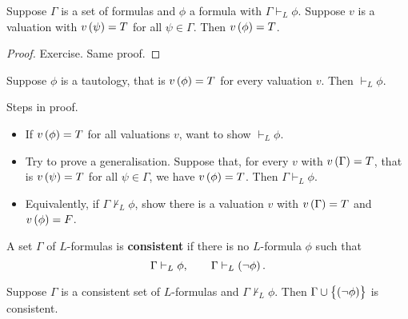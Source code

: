 \begin{theorem}
Suppose $ \Gamma $ is a set of formulas and $ \phi $ a formula with $ \Gamma \vdash_L \phi $. Suppose $ v $ is a valuation with $ v\br{\psi} = T $ for all $ \psi \in \Gamma $. Then $ v\br{\phi} = T $.
\end{theorem}

\begin{proof}
Exercise. Same proof.
\end{proof}

\pagebreak

\begin{theorem}
\label{thm:1.3.4}
Suppose $ \phi $ is a tautology, that is $ v\br{\phi} = T $ for every valuation $ v $. Then $ \vdash_L \phi $.
\end{theorem}

\begin{remark}
Steps in proof.
\begin{itemize}
\item If $ v\br{\phi} = T $ for all valuations $ v $, want to show $ \vdash_L \phi $.
\item Try to prove a generalisation. Suppose that, for every $ v $ with $ v\br{\Gamma} = T $, that is $ v\br{\psi} = T $ for all $ \psi \in \Gamma $, we have $ v\br{\phi} = T $. Then $ \Gamma \vdash_L \phi $.
\item Equivalently, if $ \Gamma \not\vdash_L \phi $, show there is a valuation $ v $ with $ v\br{\Gamma} = T $ and $ v\br{\phi} = F $.
\end{itemize}
\end{remark}

\begin{definition}
A set $ \Gamma $ of $ L $-formulas is \textbf{consistent} if there is no $ L $-formula $ \phi $ such that
$$ \Gamma \vdash_L \phi, \qquad \Gamma \vdash_L \notb{\phi}. $$
\end{definition}

\begin{proposition}
\label{prop:1.3.7}
Suppose $ \Gamma $ is a consistent set of $ L $-formulas and $ \Gamma \not\vdash_L \phi $. Then $ \Gamma \cup \cbr{\notb{\phi}} $ is consistent.
\end{proposition}


